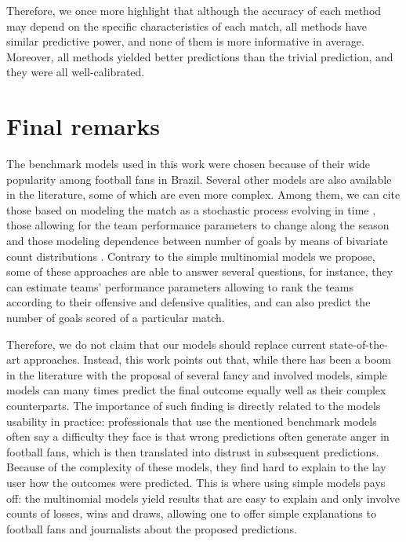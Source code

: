 \documentclass[journal,article,accept,moreauthors,pdftex,12pt,a4paper]{mdpi}
\begin{document}
	
	{\color{darkgreen}Therefore, we once more highlight that 
	although the accuracy of each method may depend on the specific characteristics of each match,
	all methods have similar predictive power, and none of them is more informative  in average. 
    Moreover, all methods yielded better predictions than the trivial prediction, and they were all well-calibrated.}
	
	\section{Final remarks}
	\label{sec::remarks}
	
	{\color{blue}The benchmark models used in this work were chosen because of their wide popularity among football fans in Brazil.
	Several other models are also available in the literature, some of which are even more complex.
	Among them, we can cite those based on modeling the match as a stochastic process evolving in time \citep{Dixon98, Volf2009, Titman2015}, those allowing for the team performance parameters to change along the season \citep{Rue2000, Crowder2002, Owen2011, Koopman2015} and those modeling dependence between number of goals by means of bivariate count distributions \citep{Dixon97, Karlis2003, McHale2007, McHale2011}. 
Contrary to the simple multinomial models we propose, some of these approaches are able to answer several questions, for instance, they can estimate teams' performance parameters allowing to rank the teams according to their offensive and defensive qualities, and can also predict the number of goals scored of a particular match. 

Therefore, we do not claim that our models should replace
	current state-of-the-art approaches. Instead, this work points out that, while there has been a boom in the literature with the proposal of several fancy and involved models,
	simple models can many times predict the final outcome equally well as their complex counterparts. 
	The importance of such finding is directly related to the models usability in practice: professionals that use the mentioned
	benchmark models often say a difficulty they face is that
	wrong predictions often generate anger in football fans, which is then translated into distrust
	in subsequent predictions. Because of the complexity of these models, they find hard to explain to the lay user how the outcomes were predicted.
	This is where using simple models pays off:  the multinomial models yield results that are
	easy to explain and only involve counts of losses, wins and draws, allowing one to offer simple explanations to football fans and journalists about the proposed predictions.} 
	
\end{document}
